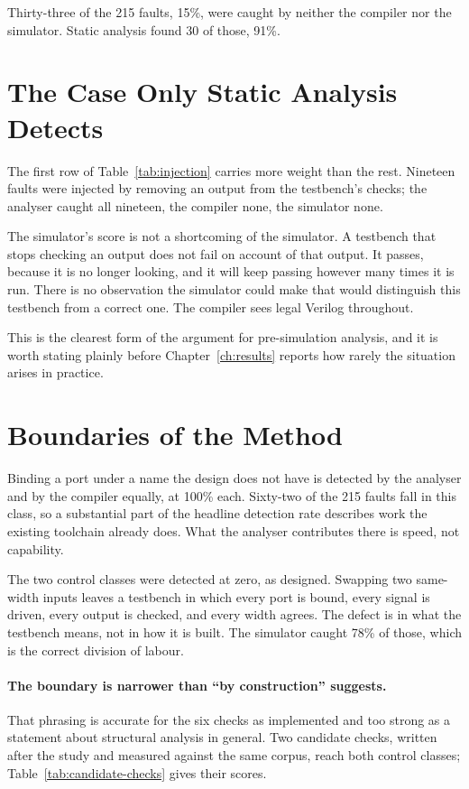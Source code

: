 \documentclass[11pt,a4paper,titlepage=false]{scrreprt}
\begin{document}
Thirty-three of the 215 faults, 15\%, were caught by neither the compiler nor the simulator.
Static analysis found 30 of those, 91\%.

\section{The Case Only Static Analysis Detects}\label{sec:val-unobserved}

The first row of Table~\ref{tab:injection} carries more weight than the rest. Nineteen
faults were injected by removing an output from the testbench's checks; the analyser caught
all nineteen, the compiler none, the simulator none.

The simulator's score is not a shortcoming of the simulator. A testbench that stops checking
an output does not fail on account of that output. It passes, because it is no longer
looking, and it will keep passing however many times it is run. There is no observation the
simulator could make that would distinguish this testbench from a correct one. The compiler
sees legal Verilog throughout.

This is the clearest form of the argument for pre-simulation analysis, and it is worth
stating plainly before Chapter~\ref{ch:results} reports how rarely the situation arises in
practice.

\section{Boundaries of the Method}\label{sec:val-limits}

Binding a port under a name the design does not have is detected by the analyser and by the
compiler equally, at 100\% each. Sixty-two of the 215 faults fall in this class, so a
substantial part of the headline detection rate describes work the existing toolchain
already does. What the analyser contributes there is speed, not capability.

The two control classes were detected at zero, as designed. Swapping two same-width inputs
leaves a testbench in which every port is bound, every signal is driven, every output is
checked, and every width agrees. The defect is in what the testbench means, not in how it is
built. The simulator caught 78\% of those, which is the correct division of labour.

\paragraph{The boundary is narrower than ``by construction'' suggests.} That phrasing is
accurate for the six checks as implemented and too strong as a statement about structural
analysis in general. Two candidate checks, written after the study and measured against the
same corpus, reach both control classes; Table~\ref{tab:candidate-checks} gives their scores.
\end{document}
